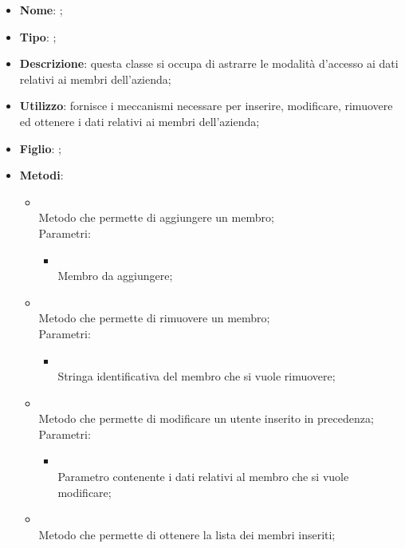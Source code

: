\begin{itemize}
	\item \textbf{Nome}: ;
	\item \textbf{Tipo}: ;
	\item \textbf{Descrizione}: questa classe si occupa di astrarre le modalità d'accesso ai dati relativi ai membri dell'azienda;
	\item \textbf{Utilizzo}: fornisce i meccanismi necessare per inserire, modificare, rimuovere ed ottenere i dati relativi ai membri dell'azienda;
	\item \textbf{Figlio}: ;
	\item \textbf{Metodi}:
	\begin{itemize}
		\item[]  \\
		Metodo che permette di aggiungere un membro;\\
		Parametri:
		\begin{itemize}
			\item {} \\
			Membro da aggiungere;
		\end{itemize}
		\item[]  \\
		Metodo che permette di rimuovere un membro;\\
		Parametri:
		\begin{itemize}
			\item {} \\
			Stringa identificativa del membro che si vuole rimuovere;
		\end{itemize}
		\item[]  \\
		Metodo che permette di modificare un utente inserito in precedenza;\\
		Parametri:
		\begin{itemize}
			\item {} \\
			Parametro contenente i dati relativi al membro che si vuole modificare;
		\end{itemize}
		\item[]  \\
		Metodo che permette di ottenere la lista dei membri inseriti;\\

\end{itemize}
\end{itemize}
